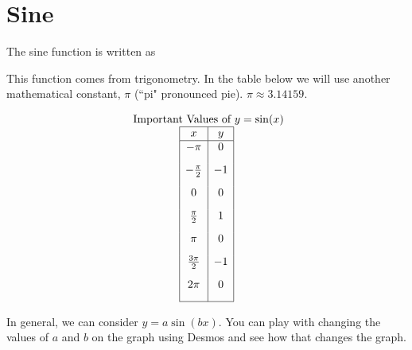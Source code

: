\documentclass[nooutcomes]{ximera}
\begin{document}
\begin{center}  
\end{center}



\newpage


\section{Sine}
The sine function is written as

\begin{image}
\end{image}


This function comes from trigonometry. In the table below we will use another mathematical constant, $\pi$ (``pi" pronounced pie). $\pi \approx 3.14159$.

\begin{image}
\end{image}

\[
\begin{array}{ c }
 \text{ Important Values of  $y=\sin(x)$}\\
\begin{array}{|c|c|}
 \hline
 x & y\\
 \hline
 -\pi&0\\[2ex]
 -\frac{\pi}{2}&-1\\[2ex]
 0&0\\[2ex]
 \frac{\pi}{2}&1\\[2ex]
 \pi&0\\[2ex]
\frac{3\pi}{2}&-1\\[2ex]
 2 \pi&0\\[2ex]
\hline
\end{array}
\end{array}
\]


In general, we can consider $y=a\sin(bx)$.  You can play with changing the values of $a$ and $b$ on the graph using Desmos and see how that changes the graph.  

\begin{center}  
\end{center}
\end{document}
